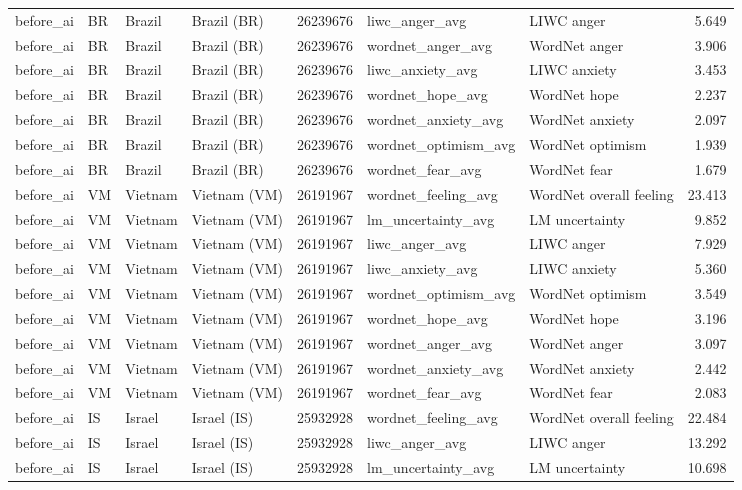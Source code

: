 \begin{tabular}{llllrllr}
before\_ai & BR & Brazil & Brazil (BR) & 26239676 & liwc\_anger\_avg & LIWC anger & 5.649 \\
before\_ai & BR & Brazil & Brazil (BR) & 26239676 & wordnet\_anger\_avg & WordNet anger & 3.906 \\
before\_ai & BR & Brazil & Brazil (BR) & 26239676 & liwc\_anxiety\_avg & LIWC anxiety & 3.453 \\
before\_ai & BR & Brazil & Brazil (BR) & 26239676 & wordnet\_hope\_avg & WordNet hope & 2.237 \\
before\_ai & BR & Brazil & Brazil (BR) & 26239676 & wordnet\_anxiety\_avg & WordNet anxiety & 2.097 \\
before\_ai & BR & Brazil & Brazil (BR) & 26239676 & wordnet\_optimism\_avg & WordNet optimism & 1.939 \\
before\_ai & BR & Brazil & Brazil (BR) & 26239676 & wordnet\_fear\_avg & WordNet fear & 1.679 \\
before\_ai & VM & Vietnam & Vietnam (VM) & 26191967 & wordnet\_feeling\_avg & WordNet overall feeling & 23.413 \\
before\_ai & VM & Vietnam & Vietnam (VM) & 26191967 & lm\_uncertainty\_avg & LM uncertainty & 9.852 \\
before\_ai & VM & Vietnam & Vietnam (VM) & 26191967 & liwc\_anger\_avg & LIWC anger & 7.929 \\
before\_ai & VM & Vietnam & Vietnam (VM) & 26191967 & liwc\_anxiety\_avg & LIWC anxiety & 5.360 \\
before\_ai & VM & Vietnam & Vietnam (VM) & 26191967 & wordnet\_optimism\_avg & WordNet optimism & 3.549 \\
before\_ai & VM & Vietnam & Vietnam (VM) & 26191967 & wordnet\_hope\_avg & WordNet hope & 3.196 \\
before\_ai & VM & Vietnam & Vietnam (VM) & 26191967 & wordnet\_anger\_avg & WordNet anger & 3.097 \\
before\_ai & VM & Vietnam & Vietnam (VM) & 26191967 & wordnet\_anxiety\_avg & WordNet anxiety & 2.442 \\
before\_ai & VM & Vietnam & Vietnam (VM) & 26191967 & wordnet\_fear\_avg & WordNet fear & 2.083 \\
before\_ai & IS & Israel & Israel (IS) & 25932928 & wordnet\_feeling\_avg & WordNet overall feeling & 22.484 \\
before\_ai & IS & Israel & Israel (IS) & 25932928 & liwc\_anger\_avg & LIWC anger & 13.292 \\
before\_ai & IS & Israel & Israel (IS) & 25932928 & lm\_uncertainty\_avg & LM uncertainty & 10.698 \\

\end{tabular}

